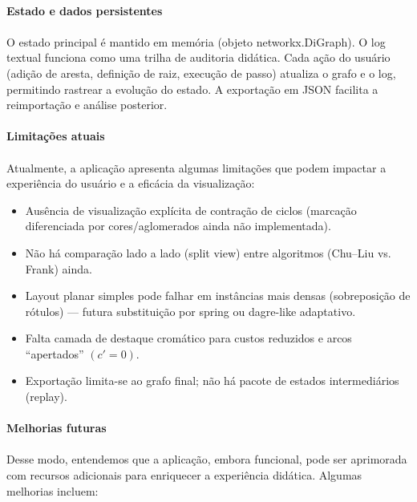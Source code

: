 \documentclass[12pt,a4paper]{article}
\def\texttt#1{#1}%
\def\emph#1{#1}%
\begin{document}
\paragraph{Estado e dados persistentes}
\paragraph{}    
O estado principal é mantido em memória (objeto \texttt{networkx.DiGraph}). O log textual funciona como uma \emph{trilha de auditoria didática}. Cada ação do usuário (adição de aresta, definição de raiz, execução de passo) atualiza o grafo e o log, permitindo rastrear a evolução do estado. A exportação em JSON facilita a reimportação e análise posterior.

\paragraph{Limitações atuais}
\paragraph{}
Atualmente, a aplicação apresenta algumas limitações que podem impactar a experiência do usuário e a eficácia da visualização:

\begin{itemize}\setlength{\itemsep}{2pt}
    \item Ausência de visualização explícita de contração de ciclos (marcação diferenciada por cores/aglomerados ainda não implementada).
    \item Não há comparação lado a lado (split view) entre algoritmos (Chu--Liu vs. Frank) ainda.
    \item Layout planar simples pode falhar em instâncias mais densas (sobreposição de rótulos) — futura substituição por \texttt{spring} ou \texttt{dagre}-like adaptativo.
    \item Falta camada de destaque cromático para custos reduzidos e arcos “apertados” \((c' = 0)\).
    \item Exportação limita-se ao grafo final; não há pacote de estados intermediários (\emph{replay}).
\end{itemize}

\paragraph{Melhorias futuras}
\paragraph{}
Desse modo, entendemos que a aplicação, embora funcional, pode ser aprimorada com recursos adicionais para enriquecer a experiência didática. Algumas melhorias incluem:
\end{document}
